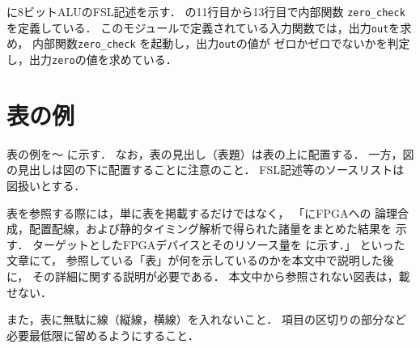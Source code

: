 \documentclass{jarticle}[11pt]
\newcommand{\figref}[1]{\makebox{図~\ref{#1}}}
\newcommand{\tabref}[1]{\makebox{表~\ref{#1}}}
\begin{document}
    \figref{fig:8ビットALUのFSL記述}に8ビットALUのFSL記述を示す．
    \figref{fig:8ビットALUのFSL記述}の11行目から13行目で内部関数
    \verb|zero_check| を定義している．
    このモジュールで定義されている入力関数では，出力\verb|out|を求め，
    内部関数\verb|zero_check| を起動し，出力\verb|out|の値が
    ゼロかゼロでないかを判定し，出力\verb|zero|の値を求めている．
     
    \section{表の例}
     
    表の例を\tabref{tab:FPGAへの論理合成等で得られた諸量のまとめ}〜
    \tabref{tab:目標達成度と自己評価}に示す．
    なお，表の見出し（表題）は表の上に配置する．
    一方，図の見出しは図の下に配置することに注意のこと．
    FSL記述等のソースリストは図扱いとする．
     
    表を参照する際には，単に表を掲載するだけではなく，
    「\tabref{tab:FPGAへの論理合成等で得られた諸量のまとめ}にFPGAへの
    論理合成，配置配線，および静的タイミング解析で得られた諸量をまとめた結果を
    示す．
    ターゲットとしたFPGAデバイスとそのリソース量を
    \tabref{tab:ターゲットFPGAデバイスとそのリソース量}に示す．」
    といった文章にて，
    参照している「表」が何を示しているのかを本文中で説明した後に，
    その詳細に関する説明が必要である．
    本文中から参照されない図表は，載せない．
     
    また，表に無駄に線（縦線，横線）を入れないこと．
    項目の区切りの部分など必要最低限に留めるようにすること．
     
     
     
\end{document}
